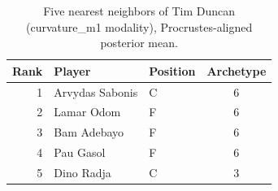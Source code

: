\begin{table}[htbp]
  \centering\small
  \begin{tabular}{rllc}
    \toprule
    Rank & Player & Position & Archetype \\
    \midrule
    1 & Arvydas Sabonis & C & 6 \\
    2 & Lamar Odom & F & 6 \\
    3 & Bam Adebayo & F & 6 \\
    4 & Pau Gasol & F & 6 \\
    5 & Dino Radja & C & 3 \\
    \bottomrule
  \end{tabular}
  \caption{Five nearest neighbors of Tim Duncan (curvature_m1 modality), Procrustes-aligned posterior mean.}
  \label{tab:Tim_Duncan_neighbors_curvature_m1}
\end{table}

